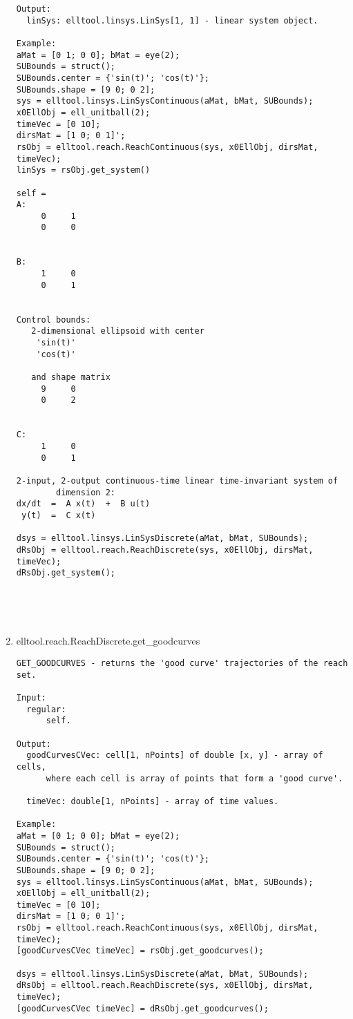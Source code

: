 \begin{enumerate}
\begin{lstlisting}
Output:
  linSys: elltool.linsys.LinSys[1, 1] - linear system object.

Example:
aMat = [0 1; 0 0]; bMat = eye(2);
SUBounds = struct();
SUBounds.center = {'sin(t)'; 'cos(t)'};
SUBounds.shape = [9 0; 0 2];
sys = elltool.linsys.LinSysContinuous(aMat, bMat, SUBounds);
x0EllObj = ell_unitball(2);
timeVec = [0 10];
dirsMat = [1 0; 0 1]';
rsObj = elltool.reach.ReachContinuous(sys, x0EllObj, dirsMat, timeVec);
linSys = rsObj.get_system()

self =
A:
     0     1
     0     0


B:
     1     0
     0     1


Control bounds:
   2-dimensional ellipsoid with center
    'sin(t)'
    'cos(t)'

   and shape matrix
     9     0
     0     2


C:
     1     0
     0     1

2-input, 2-output continuous-time linear time-invariant system of
        dimension 2:
dx/dt  =  A x(t)  +  B u(t)
 y(t)  =  C x(t)

dsys = elltool.linsys.LinSysDiscrete(aMat, bMat, SUBounds);
dRsObj = elltool.reach.ReachDiscrete(sys, x0EllObj, dirsMat, timeVec);
dRsObj.get_system();





\end{lstlisting}
\fontfamily{\familydefault}
\selectfont
\item {elltool.reach.ReachDiscrete.get\_goodcurves}
\selectfont
\begin{lstlisting}
GET_GOODCURVES - returns the 'good curve' trajectories of the reach set.

Input:
  regular:
      self.

Output:
  goodCurvesCVec: cell[1, nPoints] of double [x, y] - array of cells,
      where each cell is array of points that form a 'good curve'.

  timeVec: double[1, nPoints] - array of time values.

Example:
aMat = [0 1; 0 0]; bMat = eye(2);
SUBounds = struct();
SUBounds.center = {'sin(t)'; 'cos(t)'};
SUBounds.shape = [9 0; 0 2];
sys = elltool.linsys.LinSysContinuous(aMat, bMat, SUBounds);
x0EllObj = ell_unitball(2);
timeVec = [0 10];
dirsMat = [1 0; 0 1]';
rsObj = elltool.reach.ReachContinuous(sys, x0EllObj, dirsMat, timeVec);
[goodCurvesCVec timeVec] = rsObj.get_goodcurves();

dsys = elltool.linsys.LinSysDiscrete(aMat, bMat, SUBounds);
dRsObj = elltool.reach.ReachDiscrete(sys, x0EllObj, dirsMat, timeVec);
[goodCurvesCVec timeVec] = dRsObj.get_goodcurves();






\end{lstlisting}
\end{enumerate}

